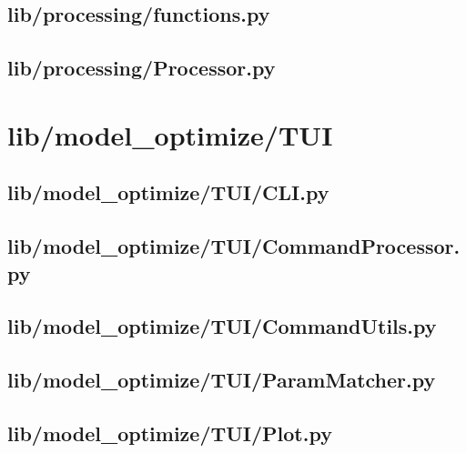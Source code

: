\subsection*{lib/processing/functions.py}
\label{ap:functions}
\subsection*{lib/processing/Processor.py}
\label{ap:Processor}
\section{lib/model\_optimize/TUI}
\subsection*{lib/model\_optimize/TUI/CLI.py}
\label{ap:CLI}
\subsection*{lib/model\_optimize/TUI/CommandProcessor.py}
\label{ap:CommandProcessor}
\subsection*{lib/model\_optimize/TUI/CommandUtils.py}
\label{ap:CommandUtils}
\subsection*{lib/model\_optimize/TUI/ParamMatcher.py}
\label{ap:ParamMatcher}
\subsection*{lib/model\_optimize/TUI/Plot.py}
\label{ap:Plot}
